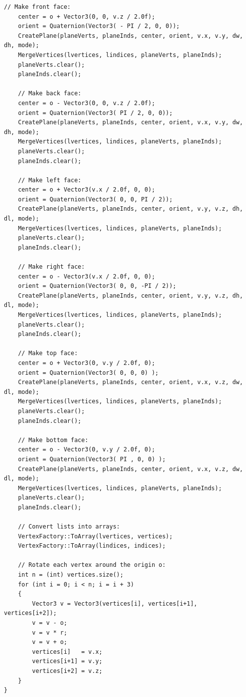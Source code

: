 \begin{lstlisting}[caption= The \texttt{VertexFactory} class]
    // Make front face:
    center = o + Vector3(0, 0, v.z / 2.0f);
    orient = Quaternion(Vector3( - PI / 2, 0, 0));
    CreatePlane(planeVerts, planeInds, center, orient, v.x, v.y, dw, dh, mode);
    MergeVertices(lvertices, lindices, planeVerts, planeInds);
    planeVerts.clear();
    planeInds.clear();
    
    // Make back face:
    center = o - Vector3(0, 0, v.z / 2.0f);
    orient = Quaternion(Vector3( PI / 2, 0, 0));
    CreatePlane(planeVerts, planeInds, center, orient, v.x, v.y, dw, dh, mode);
    MergeVertices(lvertices, lindices, planeVerts, planeInds);
    planeVerts.clear();
    planeInds.clear();
    
    // Make left face:
    center = o + Vector3(v.x / 2.0f, 0, 0);
    orient = Quaternion(Vector3( 0, 0, PI / 2));
    CreatePlane(planeVerts, planeInds, center, orient, v.y, v.z, dh, dl, mode);
    MergeVertices(lvertices, lindices, planeVerts, planeInds);
    planeVerts.clear();
    planeInds.clear();
    
    // Make right face:
    center = o - Vector3(v.x / 2.0f, 0, 0);
    orient = Quaternion(Vector3( 0, 0, -PI / 2));
    CreatePlane(planeVerts, planeInds, center, orient, v.y, v.z, dh, dl, mode);
    MergeVertices(lvertices, lindices, planeVerts, planeInds);
    planeVerts.clear();
    planeInds.clear();
    
    // Make top face:
    center = o + Vector3(0, v.y / 2.0f, 0);
    orient = Quaternion(Vector3( 0, 0, 0) );
    CreatePlane(planeVerts, planeInds, center, orient, v.x, v.z, dw, dl, mode);
    MergeVertices(lvertices, lindices, planeVerts, planeInds);
    planeVerts.clear();
    planeInds.clear();
    
    // Make bottom face:
    center = o - Vector3(0, v.y / 2.0f, 0);
    orient = Quaternion(Vector3( PI , 0, 0) );
    CreatePlane(planeVerts, planeInds, center, orient, v.x, v.z, dw, dl, mode);
    MergeVertices(lvertices, lindices, planeVerts, planeInds);
    planeVerts.clear();
    planeInds.clear();
    
    // Convert lists into arrays:
    VertexFactory::ToArray(lvertices, vertices);
    VertexFactory::ToArray(lindices, indices);
    
    // Rotate each vertex around the origin o:
    int n = (int) vertices.size();
    for (int i = 0; i < n; i = i + 3)
    {
        Vector3 v = Vector3(vertices[i], vertices[i+1], vertices[i+2]);
        v = v - o;
        v = v * r;
        v = v + o;
        vertices[i]   = v.x;
        vertices[i+1] = v.y;
        vertices[i+2] = v.z;
    }
}
\end{lstlisting}

